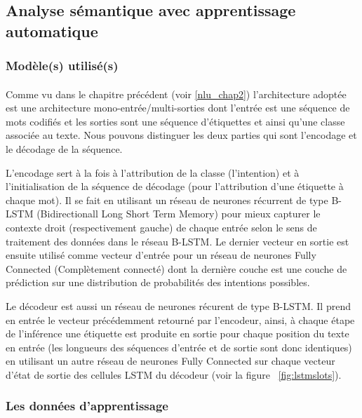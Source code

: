 	\subsection{Analyse sémantique avec apprentissage automatique}
		\subsubsection{Modèle(s) utilisé(s)}
		\paragraph{}\label{joint_model}
		Comme vu dans le chapitre précédent (voir \ref{nlu_chap2}) l'architecture adoptée est une architecture mono-entrée/multi-sorties dont l'entrée est une séquence de mots codifiés et les sorties sont une séquence d'étiquettes et ainsi qu'une classe associée au texte. Nous pouvons distinguer les deux parties qui sont l'encodage et le décodage de la séquence. 
		\par L'encodage sert à la fois à l'attribution de la classe (l'intention) et à l'initialisation de la séquence de décodage (pour l'attribution d'une étiquette à chaque mot).
		Il se fait en utilisant un réseau de neurones récurrent de type B-LSTM (Bidirectionall Long Short Term Memory) pour mieux capturer le contexte droit (respectivement gauche) de chaque entrée selon le sens de traitement des données dans le réseau B-LSTM. Le dernier vecteur en sortie est ensuite utilisé comme vecteur d'entrée pour un réseau de neurones Fully Connected (Complètement connecté) dont la dernière couche est une couche de prédiction sur une distribution de probabilités des intentions possibles.
		\par
		Le décodeur est aussi un réseau de neurones récurent de type B-LSTM. Il prend en entrée le vecteur précédemment retourné par l'encodeur, ainsi, à chaque étape de l'inférence une étiquette est produite en sortie pour chaque position du texte en entrée (les longueurs des séquences d'entrée et de sortie sont donc identiques) en utilisant un autre réseau de neurones Fully Connected sur chaque vecteur d'état de sortie des cellules LSTM du décodeur (voir la figure ~\ref{fig:lstmslots}).
		\subsubsection{Les données d'apprentissage}
